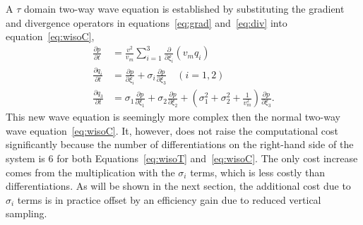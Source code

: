 A $\tau$ domain two-way wave equation is established by substituting the gradient and divergence operators in equations~\ref{eq:grad} and~\ref{eq:div} into equation~\ref{eq:wisoC},
\begin{align}
\label{eq:wisoT}
\frac{\partial p}{\partial t} & = \frac{v^2}{v_m} \sum_{i=1}^3 \frac{\partial}{\partial \xi_i} \left(v_m q_i\right) \nonumber \\
\frac{\partial q_i}{\partial t} & = \frac{\partial p}{\partial \xi_i} + \sigma_i \frac{\partial p}{\partial \xi_3} \quad (i=1,2) \\
\frac{\partial q_3}{\partial t} & = \sigma_1\frac{\partial p}{\partial \xi_1} + \sigma_2\frac{\partial p}{\partial \xi_2} + \left(\sigma_1^2+\sigma_2^2+\frac{1}{v_m^2}\right)\frac{\partial p}{\partial \xi_3} \nonumber .
\end{align}
This new wave equation is seemingly more complex then the normal two-way wave equation~\ref{eq:wisoC}. It, however, does not raise the computational cost significantly because the number of differentiations on the right-hand side of the system is $6$ for both Equations~\ref{eq:wisoT} and~\ref{eq:wisoC}. The only cost increase comes from the multiplication with the $\sigma_i$ terms, which is less costly than differentiations. As will be shown in the next section, the additional cost due to $\sigma_i$ terms is in practice offset by an efficiency gain due to reduced vertical sampling.

